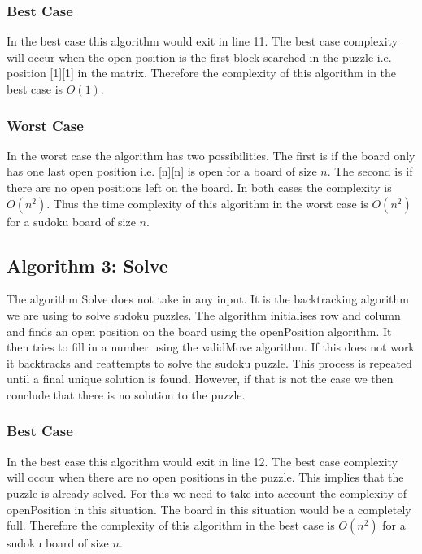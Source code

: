 \documentclass[12pt,a4paper,titlepage]{article}
\begin{document}
\subsubsection{Best Case}

In the best case this algorithm would exit in line 11. The best case complexity will occur when the open position is the first block searched in the puzzle i.e. position [1][1] in the matrix. Therefore the complexity of this algorithm in the best case is $O(1)$.

\subsubsection{Worst Case}

In the worst case the algorithm has two possibilities. The first is if the board only has one last open position i.e. [n][n] is open for a board of size $n$. The second is if there are no open positions left on the board. In both cases the complexity is $O(n^{2})$. Thus the time complexity of this algorithm in the worst case is $O(n^{2})$ for a sudoku board of size $n$.

\newpage
\subsection{Algorithm 3: Solve}

The algorithm Solve does not take in any input. It is the backtracking algorithm we are using to solve sudoku puzzles. The algorithm initialises row and column and finds an open position on the board using the openPosition algorithm. It then tries to fill in a number using the validMove algorithm. If this does not work it backtracks and reattempts to solve the sudoku puzzle. This process is repeated until a final unique solution is found. However, if that is not the case we then conclude that there is no solution to the puzzle.

\subsubsection{Best Case}

In the best case this algorithm would exit in line 12. The best case complexity will occur when there are no open positions in the puzzle. This implies that the puzzle is already solved. For this we need to take into account the complexity of openPosition in this situation. The board in this situation would be a completely full. Therefore the complexity of this algorithm in the best case is $O(n^{2})$ for a sudoku board of size $n$.
\end{document}
